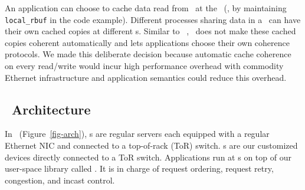 An application can choose to cache data read from \sysread\ at the \CN\ (\eg, by maintaining \texttt{local\_rbuf} in the code example).
Different processes sharing data in a \rspace\ can have their own cached copies at different \CN{}s.
Similar to ~\cite{Shan18-OSDI}, \sys\ does not make these cached copies coherent automatically and lets applications choose their own coherence
protocols.
We made this deliberate decision because automatic cache coherence on every read/write would incur  high performance overhead with commodity Ethernet infrastructure
and application semantics could reduce this overhead.


\subsection{\sys\ Architecture}

In \sys\ (Figure~\ref{fig-arch}), \CN{}s are regular servers each equipped with a regular Ethernet NIC and connected to a top-of-rack (ToR) switch.
\MN{}s are our customized devices directly connected to a ToR switch.
%
Applications run at \CN{}s on top of our user-space library called {\em \syslib}.
It is in charge of request ordering, request retry, congestion, and incast control. 

